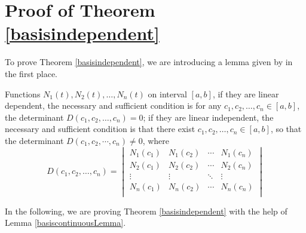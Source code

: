\section{Proof of Theorem \ref{basisindependent}}\label{AppendixBasisproof}

To prove Theorem \ref{basisindependent}, we are introducing a lemma given by \citep{Peng1983linear} in the first place. 

\begin{lemma}\label{basiscontinuousLemma}
Functions $N_1(t),N_2(t),\ldots,N_n(t)$ on interval $[a,b]$, if they are linear dependent, the necessary and sufficient condition is for any $c_1,c_2,\ldots,c_n \in [a,b]$, the determinant $D(c_1,c_2,\ldots,c_n)=0$; if they are linear independent, the necessary and sufficient condition is that there exist $c_1,c_2,\ldots,c_n \in [a,b]$, so that the determinant $D(c_1,c_2,\cdots,c_n) \neq 0$, where 
\begin{equation*}
D(c_1,c_2,\ldots,c_n)=
\begin{vmatrix}
N_1(c_1) & N_1(c_2) & \cdots& N_1(c_n)\\
N_2(c_1) & N_2(c_2)& \cdots & N_2(c_n)\\
 \vdots  &  \vdots  & \ddots  & \vdots  \\  
N_n(c_1) & N_n(c_2) & \cdots & N_n(c_n)\\
\end{vmatrix}
\end{equation*}
\end{lemma}

In the following, we are proving Theorem \ref{basisindependent} with the help of Lemma \ref{basiscontinuousLemma}. 

